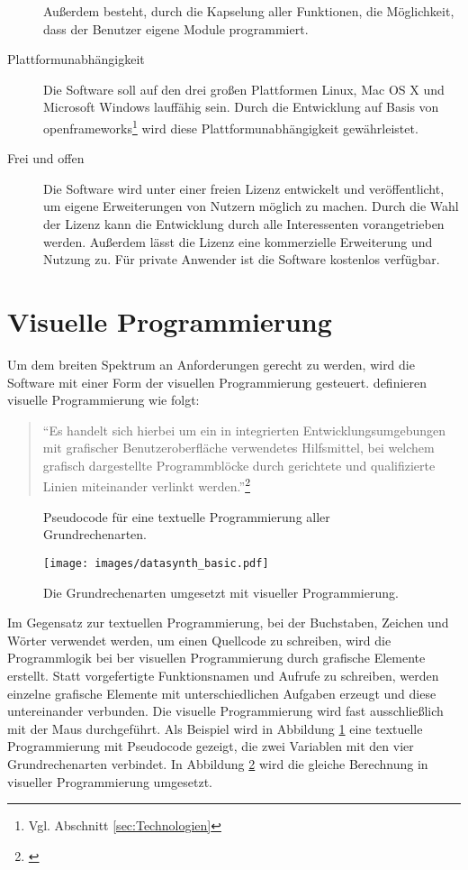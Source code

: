 \documentclass[a4paper, 
               12pt,
               DIV=calc,
               version=first,
               pdftex,
               headsepline,
               footsepline,
               bibtotocnumbered,
               liststotocnumbered]{scrreprt}
\begin{document}
\begin{description}
Außerdem besteht, durch die Kapselung aller Funktionen, die Möglichkeit, dass der
Benutzer eigene Module programmiert.
\item[Plattformunabhängigkeit]
Die Software soll auf den drei großen Plattformen Linux, Mac OS X und Microsoft Windows
lauffähig sein. Durch die Entwicklung auf Basis von openframeworks\footnote{Vgl. Abschnitt \ref{sec:Technologien}}
wird diese Plattformunabhängigkeit gewährleistet.
\item[Frei und offen]
Die Software wird unter einer freien Lizenz entwickelt und veröffentlicht,
um eigene Erweiterungen von Nutzern möglich zu machen. Durch die Wahl der Lizenz kann
die Entwicklung durch alle Interessenten vorangetrieben werden. Außerdem lässt
die Lizenz eine kommerzielle Erweiterung und Nutzung zu. Für private Anwender
ist die Software kostenlos verfügbar.
\end{description}

\section{Visuelle Programmierung}
\label{sec:visPro}
Um dem breiten Spektrum an Anforderungen gerecht zu werden,
wird die Software mit einer Form der visuellen Programmierung gesteuert.
\cite{Henning} definieren visuelle Programmierung wie folgt:
\begin{quote}
"`Es handelt sich hierbei um ein in integrierten Entwicklungsumgebungen mit
grafischer Benutzeroberfläche verwendetes Hilfsmittel, bei welchem grafisch
dargestellte Programmblöcke durch gerichtete und qualifizierte Linien miteinander
verlinkt werden."'\footnote{\citep[S.\,56]{Henning}}
\end{quote}
\begin{figure}
\centering

\caption{Pseudocode für eine textuelle Programmierung aller Grundrechenarten.}
\label{fig:textuell}
\end{figure}
\begin{figure}
\centering
\texttt{[image: images/datasynth\_basic.pdf]}
\caption{Die Grundrechenarten umgesetzt mit visueller Programmierung.}
\label{fig:datasynth_basic}
\end{figure}
Im Gegensatz zur textuellen Programmierung, bei der Buchstaben, Zeichen und Wörter
verwendet werden, um einen Quellcode zu schreiben, wird die Programmlogik bei ber
visuellen Programmierung durch grafische Elemente erstellt.
Statt vorgefertigte Funktionsnamen und Aufrufe zu schreiben, werden einzelne grafische
Elemente mit unterschiedlichen Aufgaben erzeugt und diese untereinander verbunden. Die visuelle Programmierung
wird fast ausschließlich mit der Maus durchgeführt.
Als Beispiel wird in Abbildung \ref{fig:textuell} eine textuelle Programmierung mit
Pseudocode gezeigt, die zwei Variablen mit den vier Grundrechenarten verbindet.
In Abbildung \ref{fig:datasynth_basic} wird die gleiche Berechnung
in visueller Programmierung umgesetzt.
\end{document}
